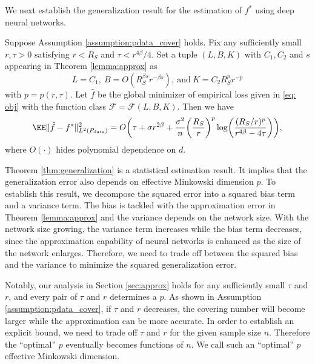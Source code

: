 We next establish the generalization result for the estimation of $f^*$ using deep neural networks.
\begin{theorem}\label{thm:generalization}
Suppose Assumption \ref{assumption:pdata_cover} holds. Fix any sufficiently small $r,\tau >0$ satisfying $r<R_S$ and $\tau < r^{4\beta}/4$.  Set a tuple $(L,B,K)$ with $C_1,C_2$ and $s$ appearing in Theorem \ref{lemma:approx} as
\begin{equation*}
    L=C_1,~ B=O(R_S^{\beta s} r^{-\beta s}), ~\text{and}~K=C_2 R_S^p r^{-p}
\end{equation*}
with $p=p(r,\tau)$. Let $\hat{f}$ be the global minimizer of empirical loss given in \eqref{eq: obj} with the function class 
$\mathcal{F}=\mathcal{F}(L,B,K)$. Then we have 
\begin{align*}
    \EE \| \hat{f} - f^*\|^2_{L^2(P_{\rm data})} = O\biggl(   \tau +  \sigma r^{2\beta} + \frac{\sigma^2}{n}  \biggl(\frac{R_S}{r} \biggr)^p \log\biggl( \frac{(R_S/r)^p}{ r^{4\beta}-4\tau}\biggr)\biggr),
\end{align*}
where $O(\cdot)$ hides polynomial dependence on $d$.
\end{theorem}

Theorem \ref{thm:generalization} is a statistical estimation result. It implies that the generalization error also depends on effective Minkowski dimension $p$. To establish this result, we decompose the squared error into a squared bias term and a variance term. The bias is tackled with the approximation error in Theorem \ref{lemma:approx} and the variance depends on the network size. With the network size growing, the variance term increases while the bias term decreases, since the approximation capability of neural networks is enhanced as the size of the network enlarges. Therefore, we need to trade off between the squared bias and the variance to minimize the squared generalization error.

Notably, our analysis in Section \ref{sec:approx} holds for any sufficiently small $\tau$ and $r$, and every pair of $\tau$ and $r$ determines a $p$. As shown in Assumption \ref{assumption:pdata_cover}, if $\tau$ and $r$ decreases, the covering number will become larger while the approximation can be more accurate. In order to establish an explicit bound, we need to trade off $\tau$ and $r$ for the given sample size $n$. Therefore the “optimal” $p$ eventually becomes functions of $n$. We call such an “optimal” $p$ effective Minkowski dimension.

